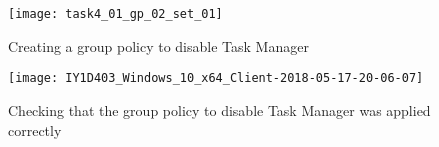 \begin{enumerate}[series=task4methodology1]
    \begin{figure}[H]
      \centering
      \captionsetup{skip=2pt}
      \texttt{[image: task4\_01\_gp\_02\_set\_01]}
      \caption{Creating a group policy to disable Task Manager}
      \label{fig:task4:gp2a}
    \end{figure}
    \begin{figure}[H]
      \centering
      \captionsetup{skip=2pt}
      \texttt{[image: IY1D403\_Windows\_10\_x64\_Client-2018-05-17-20-06-07]}
      \caption{Checking that the group policy to disable Task Manager was applied correctly}
      \label{fig:task4:gp2b}
    \end{figure}
\end{enumerate}
